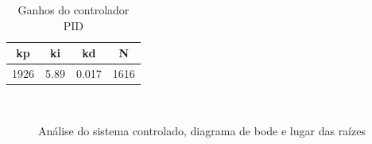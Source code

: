 \begin{table}[ht!]
\centering
	\begin{tabular}{c c c c}
	 kp  &  ki & kd &  N  \\
	 \hline \hline
		1926	 &	5.89	& 0.017	&1616
	\end{tabular} 
	\caption{Ganhos do controlador PID}
	\label{tab:controle:pid}
\end{table} 

\begin{figure}[!ht]
	\centering
		\\
		\caption{Análise do sistema controlado, diagrama de bode e lugar das raízes}
		\label{Fig:controle:analise}
\end{figure}

